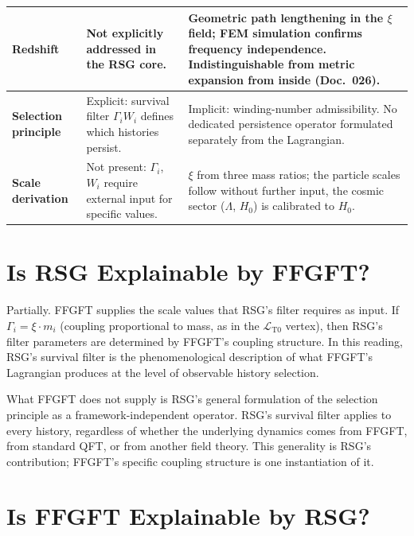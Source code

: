 {\begin{longtable}{p{3.5cm}p{5.0cm}p{5.0cm}}
\midrule

\textbf{Redshift} &
Not explicitly addressed in the RSG core. &
Geometric path lengthening in the $\xi$ field; FEM simulation confirms
frequency independence. Indistinguishable from metric expansion
from inside (Doc.~026). \\

\midrule

\textbf{Selection principle} &
Explicit: survival filter $\Gamma_i W_i$ defines which histories
persist. &
Implicit: winding-number admissibility. No dedicated persistence operator
formulated separately from the Lagrangian. \\

\midrule

\textbf{Scale derivation} &
Not present: $\Gamma_i$, $W_i$ require external input for
specific values. &
$\xi$ from three mass ratios; the particle scales follow without
further input, the cosmic sector ($\Lambda$, $H_0$) is calibrated
to $H_0$. \\

\end{longtable}
}

\section{Is RSG Explainable by FFGFT?}

Partially. FFGFT supplies the scale values that RSG's filter requires as
input. If $\Gamma_i = \xi \cdot m_i$ (coupling proportional to mass, as in
the $\mathcal{L}_{\text{T0}}$ vertex), then RSG's filter parameters are
determined by FFGFT's coupling structure. In this reading, RSG's survival
filter is the phenomenological description of what FFGFT's Lagrangian
produces at the level of observable history selection.

What FFGFT does not supply is RSG's general formulation of the selection
principle as a framework-independent operator. RSG's survival filter
applies to every history, regardless of whether the underlying dynamics
comes from FFGFT, from standard QFT, or from another field theory.
This generality is RSG's contribution; FFGFT's specific coupling structure
is one instantiation of it.

\section{Is FFGFT Explainable by RSG?}

